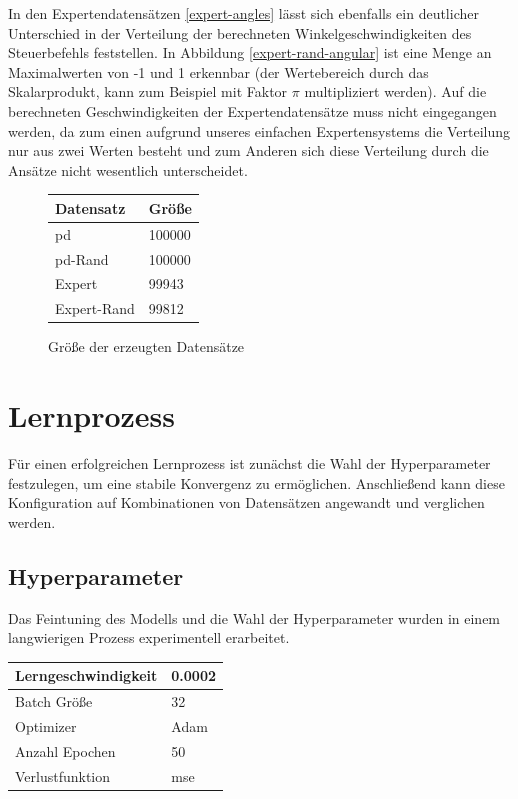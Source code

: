 In den Expertendatensätzen \ref{expert-angles} lässt sich ebenfalls ein deutlicher Unterschied in der Verteilung der berechneten Winkelgeschwindigkeiten des Steuerbefehls feststellen. In Abbildung \ref{expert-rand-angular} ist eine Menge an Maximalwerten von -1 und 1 erkennbar (der Wertebereich durch das Skalarprodukt, kann zum Beispiel mit Faktor $\pi$ multipliziert werden).
Auf die berechneten Geschwindigkeiten der Expertendatensätze muss nicht eingegangen werden, da zum einen aufgrund unseres einfachen Expertensystems die Verteilung nur aus zwei Werten besteht und zum Anderen sich diese Verteilung durch die Ansätze nicht wesentlich unterscheidet.
\begin{figure}[H]
	\centering
	\begin{tabular}[t]{|l|l|}
		\hline
		\textbf{Datensatz} & \textbf{Größe} \\
		\hline
		\acs{pd} & 100000 \\
		\hline
		\acs{pd}-Rand & 100000 \\
		\hline
		Expert & 99943 \\
		\hline
		Expert-Rand & 99812 \\
		\hline
	\end{tabular}
	\caption{Größe der erzeugten Datensätze}
\end{figure}

\section{Lernprozess}

Für einen erfolgreichen Lernprozess ist zunächst die Wahl der Hyperparameter festzulegen, um eine stabile Konvergenz zu ermöglichen. Anschließend kann diese Konfiguration auf Kombinationen von Datensätzen angewandt und verglichen werden.

\subsection{Hyperparameter}

Das Feintuning des Modells und die Wahl der Hyperparameter wurden in einem langwierigen Prozess experimentell erarbeitet.
\newpage
\begin{center}
	\begin{tabular}[t]{|l|l|}
		\hline
		Lerngeschwindigkeit & 0.0002 \\
		\hline
		Batch Größe & 32 \\
		\hline
		Optimizer & Adam \\
		\hline
		Anzahl Epochen & 50 \\
		\hline
		Verlustfunktion & \acs{mse} \\
		\hline
	\end{tabular}
\end{center}


